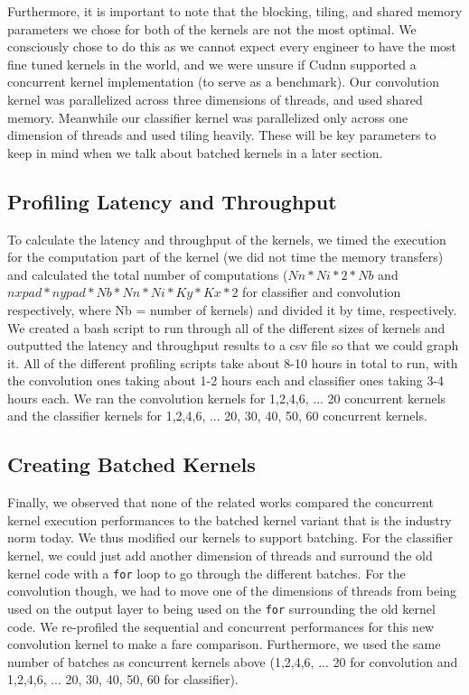 \documentclass[sigconf]{acmart}
\begin{document}
Furthermore, it is important to note that the blocking, tiling, and shared memory parameters we chose for both of the kernels are not the most optimal. We consciously chose to do this as we cannot expect every engineer to have the most fine tuned kernels in the world, and we were unsure if Cudnn supported a concurrent kernel implementation (to serve as a benchmark). Our convolution kernel was parallelized across three dimensions of threads, and used shared memory. Meanwhile our classifier kernel was parallelized only across one dimension of threads and used tiling heavily. These will be key parameters to keep in mind when we talk about batched kernels in a later section. 

\subsection{Profiling Latency and Throughput}

To calculate the latency and throughput of the kernels, we timed the execution for the computation part of the kernel (we did not time the memory transfers) and calculated the total number of computations ($Nn*Ni*2*Nb$ and $nxpad*nypad*Nb*Nn*Ni*Ky*Kx*2$ for classifier and convolution respectively, where Nb = number of kernels) and divided it by time, respectively. We created a bash script to run through all of the different sizes of kernels and outputted the latency and throughput results to a csv file so that we could graph it. All of the different profiling scripts take about 8-10 hours in total to run, with the convolution ones taking about 1-2 hours each and classifier ones taking 3-4 hours each. We ran the convolution kernels for 1,2,4,6, ... 20 concurrent kernels and the classifier kernels for 1,2,4,6, ... 20, 30, 40, 50, 60 concurrent kernels. 

\subsection{Creating Batched Kernels}
Finally, we observed that none of the related works compared the concurrent kernel execution performances to the batched kernel variant that is the industry norm today. We thus modified our kernels to support batching. For the classifier kernel, we could just add another dimension of threads and surround the old kernel code with a \lstinline{for} loop to go through the different batches. For the convolution though, we had to move one of the dimensions of threads from being used on the output layer to being used on the \lstinline{for} surrounding the old kernel code. We re-profiled the sequential and concurrent performances for this new convolution kernel to make a fare comparison. Furthermore, we used the same number of batches as concurrent kernels above (1,2,4,6, ... 20 for convolution and 1,2,4,6, ... 20, 30, 40, 50, 60 for classifier).
\end{document}
